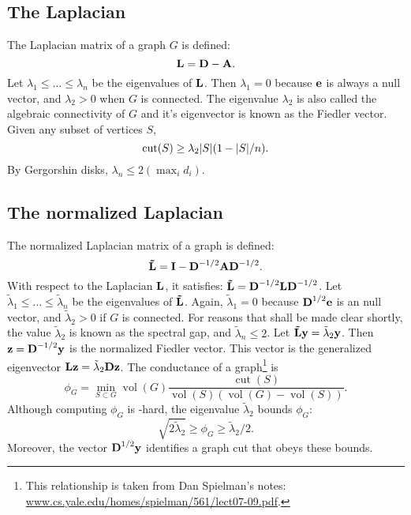 \documentclass[nofonts]{dgleich-article}
\DeclareMathOperator{\vol}{vol}
\DeclareMathOperator{\cut}{cut}
\newcommand{\mnL}{\mat{\tilde{L}}}
\newcommand{\tlambda}{\tilde{\lambda}}
\begin{document}
\subsection{The Laplacian}
The Laplacian matrix of a graph $G$ is defined:
\[ \boldsymbol{\mathrm{L}} = \boldsymbol{\mathrm{D}} - \boldsymbol{\mathrm{A}}. \]
Let $\lambda_1 \le \ldots \le \lambda_n$ be the eigenvalues of $\boldsymbol{\mathrm{L}}$.
Then $\lambda_1 = 0$ because $\boldsymbol{\mathrm{e}}$ is always a null vector,
and $\lambda_2 > 0$ when $G$ is connected.  The eigenvalue $\lambda_2$
is also called the algebraic connectivity of $G$ and it's eigenvector
is known as the Fiedler vector.  Given any subset of vertices $S$, 
\[ \cut(S) \ge \lambda_2 \cardof{S} (1 - \cardof{S}/n). \]
By Gergorshin disks, $\lambda_n \le 2 (\max_i d_i).$

\subsection{The normalized Laplacian}
The normalized Laplacian matrix of a graph is defined:
\[ \mnL = \eye - \mD^{-1/2} \mA \mD^{-1/2}. \]
With respect to the Laplacian $\boldsymbol{\mathrm{L}}$, it satisfies: $\mnL = \mD^{-1/2} \mL \mD^{-1/2}$.
Let $\tlambda_1 \le \ldots \le \tlambda_n$ be the eigenvalues of $\mnL$.
Again, $\tlambda_1 = 0$ because $\boldsymbol{\mathrm{D}}^{1/2} \boldsymbol{\mathrm{e}}$ is an null vector,
and $\tlambda_2 > 0$ if $G$ is connected.  For reasons that shall be made
clear shortly, the value $\tlambda_2$ is known as the spectral gap, 
and $\tlambda_n \le 2$.
Let $\mnL \vy = \tlambda_2 \vy$.
Then $\boldsymbol{\mathrm{z}} = \boldsymbol{\mathrm{D}}^{-1/2} \boldsymbol{\mathrm{y}}$ is the normalized Fiedler vector.  This vector 
is the generalized eigenvector $\mL \vz = \tlambda_2 \mD \vz$.
The conductance of a graph\footnote{This relationship is taken 
from Dan Spielman's notes: \url{www.cs.yale.edu/homes/spielman/561/lect07-09.pdf}.}
is 
\[ \phi_G = \min_{S \subset G} \vol(G) \frac{\cut(S)}{\vol(S) (\vol(G) - \vol(S))}. \]
Although computing $\phi_G$ is -hard, 
the eigenvalue $\tlambda_2$ bounds $\phi_G$: 
\[ \sqrt{2 \tlambda_2}  \ge \phi_G \ge \tlambda_2/2. \]
Moreover, the vector $\boldsymbol{\mathrm{D}}^{1/2} \boldsymbol{\mathrm{y}}$ identifies a graph cut that obeys these bounds.  
\end{document}
